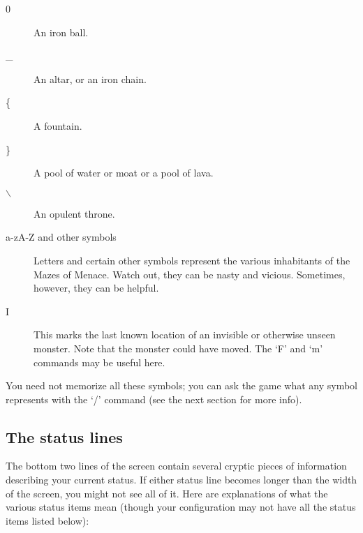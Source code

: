 \documentclass[11pt]{article}
\begin{document}
\begin{description}
\item[{0}] An iron ball.

\item[{\_}] An altar, or an iron chain.

\item[{\{}] A fountain.

\item[{\}}] A pool of water or moat or a pool of lava.

\item[{$\backslash$}] An opulent throne.

\item[{a-zA-Z and other symbols}] Letters  and certain other symbols
represent the various inhabitants of the Mazes of Menace.  Watch
out,  they  can be nasty and vicious.  Sometimes, however, they can
be helpful.

\item[{I}] This marks the last known location of an invisible or otherwise
unseen monster.   Note  that  the  monster  could  have moved.  The
`F' and `m' commands may be useful here.
\end{description}


You  need  not  memorize  all these symbols; you can ask the game what
any symbol represents with the  `/'  command  (see  the next section
for more info). 

\subsection{The status lines}
\label{sec:org9697301}
The bottom two lines of the screen contain several cryptic pieces of
information describing your current status.  If either status line
becomes longer than the width of the screen, you might not see all of
it.  Here are explanations of what the various status items mean
(though your configuration may not have all the status items listed
below):
\end{document}

